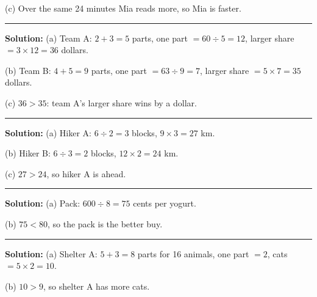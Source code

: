 \documentclass[12pt]{article}
\begin{document}
(c) Over the same 24 minutes Mia reads more, so Mia is
faster. 

\vspace{0.3cm}\noindent\rule{\linewidth}{0.2pt}\vspace{0.3cm}


\textbf{Solution:} (a) Team A: $2 + 3 = 5$ parts, one part $= 60 \div 5 = 12$,
larger share $= 3 \times 12 = 36$ dollars. 

(b) Team B: $4 + 5 = 9$ parts, one part $= 63 \div 9 = 7$, larger share
$= 5 \times 7 = 35$ dollars. 

(c) $36 > 35$: team A's larger share wins by a dollar. 

\vspace{0.3cm}\noindent\rule{\linewidth}{0.2pt}\vspace{0.3cm}


\textbf{Solution:} (a) Hiker A: $6 \div 2 = 3$ blocks, $9 \times 3 = 27$ km.

(b) Hiker B: $6 \div 3 = 2$ blocks, $12 \times 2 = 24$ km. 

(c) $27 > 24$, so hiker A is ahead. 

\vspace{0.3cm}\noindent\rule{\linewidth}{0.2pt}\vspace{0.3cm}


\textbf{Solution:} (a) Pack: $600 \div 8 = 75$ cents per yogurt. 

(b) $75 < 80$, so the pack is the better buy. 

\vspace{0.3cm}\noindent\rule{\linewidth}{0.2pt}\vspace{0.3cm}


\textbf{Solution:} (a) Shelter A: $5 + 3 = 8$ parts for 16 animals, one part $=
2$, cats $= 5 \times 2 = 10$. 

(b) $10 > 9$, so shelter A has more cats. 
\end{document}
